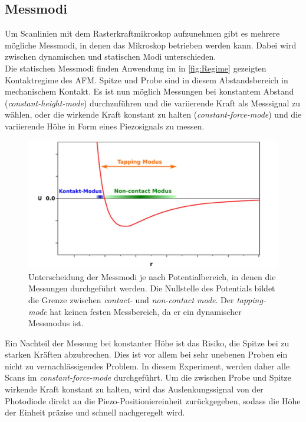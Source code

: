 \subsection{Messmodi}
\label{subsec:messmodi}
Um Scanlinien mit dem Rasterkraftmikroskop aufzunehmen gibt es mehrere mögliche Messmodi, in denen das Mikroskop betrieben werden kann. Dabei wird zwischen dynamischen und statischen Modi unterschieden.\\
Die statischen Messmodi finden Anwendung im in \autoref{fig:Regime} gezeigten Kontaktregime des AFM. Spitze und Probe sind in diesem Abstandsbereich in mechanischem Kontakt. Es ist nun möglich Messungen bei konstantem Abstand (\textit{constant-height-mode}) durchzuführen und die variierende Kraft als Messsignal zu wählen, oder die wirkende Kraft konstant zu halten (\textit{constant-force-mode}) und die variierende Höhe in Form eines Piezosignals zu messen.\\
\begin{figure}[H]
  \centering
  \includegraphics[width=\textwidth]{content/plots/regime.jpg}
  \caption{Unterscheidung der Messmodi je nach Potentialbereich, in denen die Messungen durchgeführt werden. Die Nullstelle des Potentials bildet die Grenze zwischen \textit{contact-} und \textit{non-contact mode}. Der \textit{tapping-mode} hat keinen festen Messbereich, da er ein dynamischer Messmodus ist. \cite{afm_datasheet}}
  \label{fig:Regime}
\end{figure}
Ein Nachteil der Messung bei konstanter Höhe ist das Risiko, die Spitze bei zu starken Kräften abzubrechen. Dies ist vor allem bei sehr unebenen Proben ein nicht zu vernachlässigendes Problem.
In diesem Experiment, werden daher alle Scans im \textit{constant-force-mode} durchgeführt. Um die zwischen Probe und Spitze wirkende Kraft konstant zu halten, wird das Auslenkungssignal von der Photodiode direkt an die Piezo-Positioniereinheit zurückgegeben, sodass die Höhe der Einheit präzise und schnell nachgeregelt wird.\\
